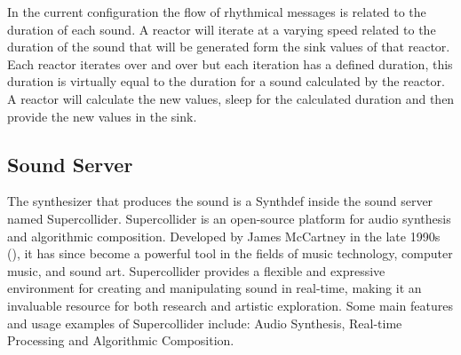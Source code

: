 \documentclass[a4paper]{book}
\begin{document}
In the current configuration the flow of rhythmical messages is related to the duration of each sound. A reactor will iterate at a varying speed related to the duration of the sound that will be generated form the sink values of that reactor. Each reactor iterates over and over but each iteration has a defined duration, this duration is virtually equal to the duration for a sound calculated by the reactor. A reactor will calculate the new values, sleep for the calculated duration and then provide the new values in the sink. 

\subsection{Sound Server}
The synthesizer that produces the sound is a Synthdef inside the sound server named Supercollider. Supercollider is an open-source platform for audio synthesis and algorithmic composition. Developed by James McCartney in the late 1990s (\cite{scBook}), it has since become a powerful tool in the fields of music technology, computer music, and sound art. Supercollider provides a flexible and expressive environment for creating and manipulating sound in real-time, making it an invaluable resource for both research and artistic exploration. Some main features and usage examples of Supercollider include: Audio Synthesis, Real-time Processing and Algorithmic Composition.
\end{document}
